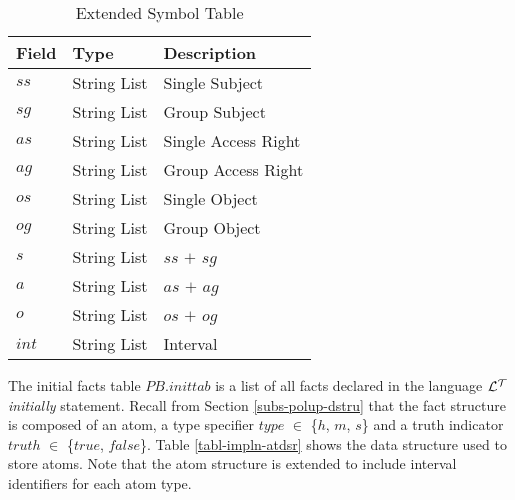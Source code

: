 \documentclass[11pt]{report}
\begin{document}
        \begin{table}[tbhp]
          \begin{center}
            \begin{tabular}[t]{|l|l|l|}
              \hline
              {\bf Field} & {\bf Type} & {\bf Description} \\
              \hline
              $ss$  & String List & Single Subject \\
              \hline
              $sg$  & String List & Group Subject \\
              \hline
              $as$  & String List & Single Access Right \\
              \hline
              $ag$  & String List & Group Access Right \\
              \hline
              $os$  & String List & Single Object \\
              \hline
              $og$  & String List & Group Object \\
              \hline
              $s$   & String List & $ss$ $+$ $sg$ \\
              \hline
              $a$   & String List & $as$ $+$ $ag$ \\
              \hline
              $o$   & String List & $os$ $+$ $og$ \\
              \hline
              $int$ & String List & Interval \\
              \hline
            \end{tabular}
          \end{center}
          \caption{Extended Symbol Table}
          \label{tabl-impln-sytab}
        \end{table}

        The initial facts table $PB$.$inittab$ is a list of all facts declared
        in the language ${\cal L^T}$ {\em initially} statement. Recall from
        Section \ref{subs-polup-dstru} that the fact structure is composed
        of an atom, a type specifier $type$ $\in$ \{$h$, $m$, $s$\} and a
        truth indicator $truth$ $\in$ \{$true$, $false$\}. Table
        \ref{tabl-impln-atdsr} shows the data structure used to store atoms.
        Note that the atom structure is extended to include interval
        identifiers for each atom type.
\end{document}
